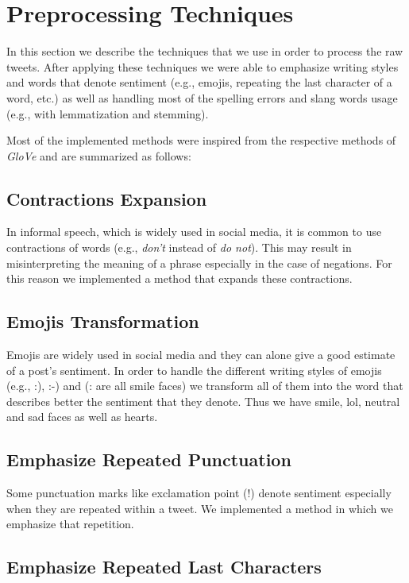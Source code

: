 \section{Preprocessing Techniques}
\label{sec:preprocessing}
In this section we describe the techniques that we use in order to process the raw tweets.
After applying these techniques we were able to emphasize writing styles and words that denote sentiment (e.g., emojis, repeating the last character of a word, etc.)
as well as handling most of the spelling errors and slang words usage (e.g., with lemmatization and stemming).

Most of the implemented methods were inspired from the respective methods of \textit{GloVe} \cite{pennington2014glove} and are summarized as follows:

\subsection{Contractions Expansion}
In informal speech, which is widely used in social media, it is common to use contractions of words (e.g., \textit{don't} instead of \textit{do not}).
This may result in misinterpreting the meaning of a phrase especially in the case of negations.
For this reason we implemented a method that expands these contractions.

\subsection{Emojis Transformation}
Emojis are widely used in social media and they can alone give a good estimate of a post's sentiment.
In order to handle the different writing styles of emojis (e.g., :), :-) and (: are all smile faces) we transform all of them into the word that describes better the sentiment that they denote.
Thus we have smile, lol, neutral and sad faces as well as hearts.

\subsection{Emphasize Repeated Punctuation}

Some punctuation marks like exclamation point (!) denote sentiment especially when they are repeated within a tweet. 
We implemented a method in which we emphasize that repetition.

\subsection{Emphasize Repeated Last Characters}

